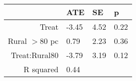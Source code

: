 \begin{tabular}{rlll}
  \hline
 & ATE & SE & p \\ 
  \hline
Treat & -3.45 & 4.52 & 0.22 \\ 
  Rural $>$80 pc & 0.79 & 2.23 & 0.36 \\ 
  Treat:Rural80 & -3.79 & 3.19 & 0.12 \\ 
  R squared & 0.44 &  &  \\ 
   \hline
\end{tabular}

